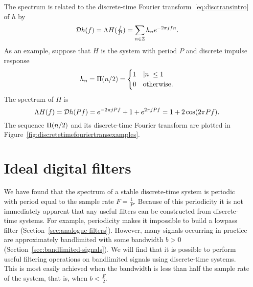 The spectrum is related to the discrete-time Fourier transform~\eqref{eq:disctransintro} of $h$ by
\[
{\mathcal D} h(f) = \Lambda H(\tfrac{f}{P}) =\sum_{n \in {\mathbb Z}} h_n e^{-2\pi j f n}.
\]
As an example, suppose that $H$ is the system with period $P$ and discrete impulse response
\[
h_n = \Pi(n/2) = \begin{cases}
1 & \left\vert n \right\vert \leq 1 \\
0 & \text{otherwise}.
\end{cases}
\]
The spectrum of $H$ is
\[
\Lambda H(f) = {\mathcal D} h(Pf) = e^{-2\pi j P f} + 1 + e^{2\pi j P f} = 1 + 2\cos(2\pi P f).
\]
The sequence $\Pi(n/2)$ and its discrete-time Fourier transform are plotted in Figure~\ref{fig:discretetimefouriertransexamples}.
% 

\section{Ideal digital filters}\label{sec:ideal_digital_filters}

We have found that the spectrum of a stable discrete-time system is periodic with period equal to the sample rate $F = \tfrac{1}{P}$.  Because of this periodicity it is not immediately apparent that any useful filters can be constructed from discrete-time systems.  For example, periodicity makes it impossible to build a lowpass filter (Section~\ref{sec:analogue-filters}).  However, many signals occurring in practice are approximately bandlimited with some bandwidth $b > 0$ (Section~\ref{sec:bandlimited-signals}).  We will find that it is possible to perform useful filtering operations on bandlimited signals using discrete-time systems.  This is most easily achieved when the bandwidth is less than half the sample rate of the system, that is, when $b < \tfrac{F}{2}$.


